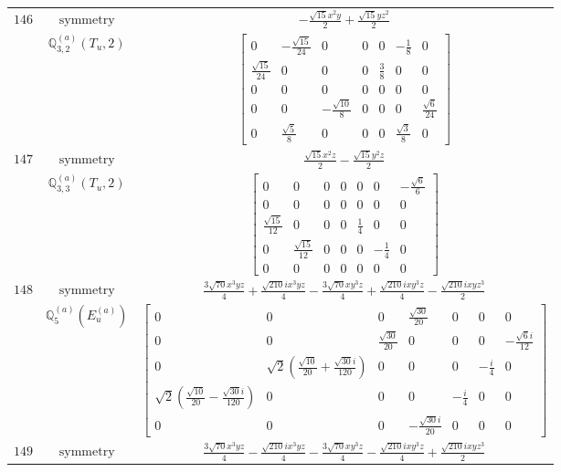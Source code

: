 \documentclass[fleqn,8pt,landscape]{jsarticle}
\begin{document}
\begin{longtable}{ccc}
$ 146 $ & $ \text{symmetry} $ & $ - \frac{\sqrt{15} x^{2} y}{2} + \frac{\sqrt{15} y z^{2}}{2} $ \\
$  $ & $ \mathbb{Q}_{3,2}^{(a)}(T_{u},2) $ & $ \begin{bmatrix} 0 & - \frac{\sqrt{15}}{24} & 0 & 0 & 0 & - \frac{1}{8} & 0 \\ \frac{\sqrt{15}}{24} & 0 & 0 & 0 & \frac{3}{8} & 0 & 0 \\ 0 & 0 & 0 & 0 & 0 & 0 & 0 \\ 0 & 0 & - \frac{\sqrt{10}}{8} & 0 & 0 & 0 & \frac{\sqrt{6}}{24} \\ 0 & \frac{\sqrt{5}}{8} & 0 & 0 & 0 & \frac{\sqrt{3}}{8} & 0 \end{bmatrix} $ \\ \hline
$ 147 $ & $ \text{symmetry} $ & $ \frac{\sqrt{15} x^{2} z}{2} - \frac{\sqrt{15} y^{2} z}{2} $ \\
$  $ & $ \mathbb{Q}_{3,3}^{(a)}(T_{u},2) $ & $ \begin{bmatrix} 0 & 0 & 0 & 0 & 0 & 0 & - \frac{\sqrt{6}}{6} \\ 0 & 0 & 0 & 0 & 0 & 0 & 0 \\ \frac{\sqrt{15}}{12} & 0 & 0 & 0 & \frac{1}{4} & 0 & 0 \\ 0 & \frac{\sqrt{15}}{12} & 0 & 0 & 0 & - \frac{1}{4} & 0 \\ 0 & 0 & 0 & 0 & 0 & 0 & 0 \end{bmatrix} $ \\ \hline
$ 148 $ & $ \text{symmetry} $ & $ \frac{3 \sqrt{70} x^{3} y z}{4} + \frac{\sqrt{210} i x^{3} y z}{4} - \frac{3 \sqrt{70} x y^{3} z}{4} + \frac{\sqrt{210} i x y^{3} z}{4} - \frac{\sqrt{210} i x y z^{3}}{2} $ \\
$  $ & $ \mathbb{Q}_{5}^{(a)}(E_{u}^{(a)}) $ & $ \begin{bmatrix} 0 & 0 & 0 & \frac{\sqrt{30}}{20} & 0 & 0 & 0 \\ 0 & 0 & \frac{\sqrt{30}}{20} & 0 & 0 & 0 & - \frac{\sqrt{6} i}{12} \\ 0 & \sqrt{2} \left(\frac{\sqrt{10}}{20} + \frac{\sqrt{30} i}{120}\right) & 0 & 0 & 0 & - \frac{i}{4} & 0 \\ \sqrt{2} \left(\frac{\sqrt{10}}{20} - \frac{\sqrt{30} i}{120}\right) & 0 & 0 & 0 & - \frac{i}{4} & 0 & 0 \\ 0 & 0 & 0 & - \frac{\sqrt{30} i}{20} & 0 & 0 & 0 \end{bmatrix} $ \\ \hline
$ 149 $ & $ \text{symmetry} $ & $ \frac{3 \sqrt{70} x^{3} y z}{4} - \frac{\sqrt{210} i x^{3} y z}{4} - \frac{3 \sqrt{70} x y^{3} z}{4} - \frac{\sqrt{210} i x y^{3} z}{4} + \frac{\sqrt{210} i x y z^{3}}{2} $ \\

\end{longtable}
\end{document}
